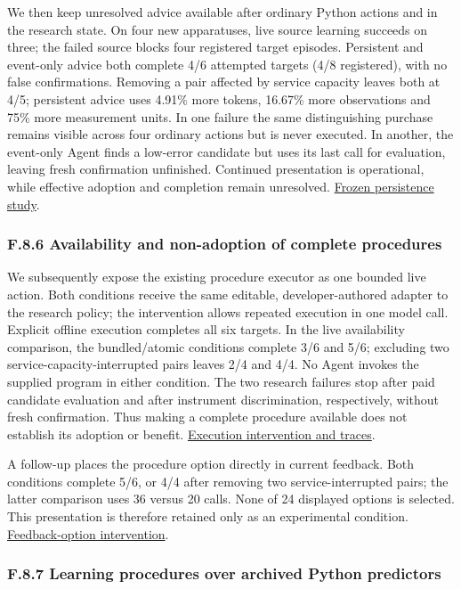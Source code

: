 \documentclass[twoside,11pt]{article}
\begin{document}
We then keep unresolved advice available after ordinary Python actions and in
the research state. On four new apparatuses, live source learning succeeds on
three; the failed source blocks four registered target episodes. Persistent and
event-only advice both complete 4/6 attempted targets (4/8 registered), with no
false confirmations. Removing a pair affected by service capacity leaves both
at 4/5; persistent advice uses 4.91\% more tokens, 16.67\% more observations and
75\% more measurement units. In one failure the same distinguishing purchase
remains visible across four ordinary actions but is never executed. In another,
the event-only Agent finds a low-error candidate but uses its last call for
evaluation, leaving fresh confirmation unfinished. Continued presentation is
operational, while effective adoption and completion remain unresolved.
\hyperlink{artifact-84}{Frozen persistence study}.


\subsubsection*{F.8.6 Availability and non-adoption of complete procedures}

We subsequently expose the existing procedure executor as one bounded live action.
Both conditions receive the same editable, developer-authored adapter to the
research policy; the intervention allows repeated execution in one model call.
Explicit offline execution completes all six targets. In the live availability
comparison, the bundled/atomic conditions complete 3/6 and 5/6; excluding two
service-capacity-interrupted pairs leaves 2/4 and 4/4. No Agent invokes the supplied
program in either condition. The two research failures stop after paid candidate
evaluation and after instrument discrimination, respectively, without fresh
confirmation. Thus making a complete procedure available does not establish its
adoption or benefit. \hyperlink{artifact-85}{Execution intervention and traces}.


A follow-up places the procedure option directly in current feedback. Both
conditions complete 5/6, or 4/4 after removing two service-interrupted pairs;
the latter comparison uses 36 versus 20 calls. None of 24 displayed options is
selected. This presentation is therefore retained only as an experimental
condition. \hyperlink{artifact-86}{Feedback-option intervention}.


\subsubsection*{F.8.7 Learning procedures over archived Python predictors}
\end{document}
